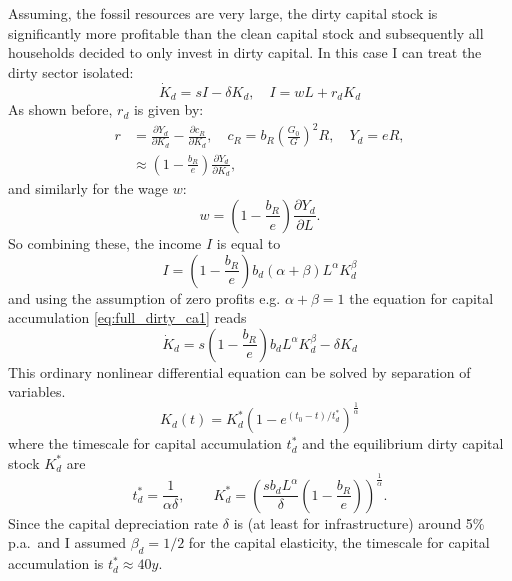 Assuming, the fossil resources are very large, the dirty capital stock is significantly more profitable than the clean capital stock and subsequently all households decided to only invest in dirty capital. In this case I can treat the dirty sector isolated:
\begin{equation}
	\dot{K}_d = s I - \delta K_d, \quad I = w L + r_d K_d
	\label{eq:full_dirty_ca1}
\end{equation}
As shown before, $r_d$ is given by:
\begin{align}
	r &= \frac{\partial Y_d}{\partial K_d} - \frac{\partial c_R}{\partial K_d}, \quad c_R = b_R\left( \frac{G_0}{G} \right)^{2} R, \quad Y_d = eR, \\
	&\approx \left( 1-\frac{b_R}{e} \right)\frac{\partial Y_d}{\partial K_d},
	\label{eq:full_dirty_capital_rent}
\end{align}
and similarly for the wage $w$:
\begin{equation}
	w = \left( 1-\frac{b_R}{e} \right)\frac{\partial Y_d}{\partial L}.
	\label{eq:full_dirty_wage}
\end{equation}
So combining these, the income $I$ is equal to
\begin{equation}
	I = \left( 1-\frac{b_R}{e} \right)b_d (\alpha + \beta) L^{\alpha} K_d^{\beta}
	\label{eq_full_dirty_income}
\end{equation}
and using the assumption of zero profits e.g. $\alpha + \beta = 1$ the equation for capital accumulation \eqref{eq:full_dirty_ca1} reads
\begin{equation}
	\dot{K}_d = s\left( 1 - \frac{b_R}{e} \right) b_d L^{\alpha} K_d^{\beta} - \delta K_d
	\label{eq:full_dirty_ca2}
\end{equation}
This ordinary nonlinear differential equation can be solved by separation of variables.
\begin{equation}
  K_d (t) = K_d^{*} \left(1 - e^{(t_0-t)/t_d^{*}} \right)^{\frac{1}{\alpha}}
	\label{eq:dirty_capital_ac_solution}
\end{equation}
where the timescale for capital accumulation $t^*_d$ and the equilibrium dirty capital stock $K^*_d$ are
\begin{equation}
	t_d^{*} = \frac{1}{\alpha \delta}, \qquad K_d^{*} = \left( \frac{s b_d L^\alpha}{\delta}\left(1-\frac{b_R}{e}  \right) \right)^{\frac{1}{\alpha}}.
	\label{eq:full_dirty_capital_equilibrium_values}
\end{equation}
Since the capital depreciation rate $\delta$ is (at least for infrastructure) around 5\% p.a.\ and I assumed $\beta_d=1/2$ for the capital elasticity, the timescale for capital accumulation is $t^*_d \approx 40 y$.

